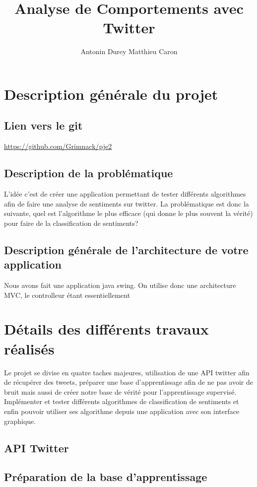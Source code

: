 \documentclass[a4paper,10pt]{report}
\title{Analyse de Comportements avec Twitter}
\author{Antonin Durey Matthieu Caron}
\begin{document}
\maketitle
\chapter{Description générale du projet}
  \section{Lien vers le git}
    \url{https://github.com/Grimnack/pje2}
  \section{Description de la problématique}
    L'idée c'est de créer une application permettant de tester différents algorithmes
    afin de faire une analyse de sentiments sur twitter. La problématique est donc la suivante,
    quel est l'algorithme le plus efficace (qui donne le plus souvent la vérité) pour faire de la 
    classification de sentiments?
  \section{Description générale de l'architecture de votre application}
    Nous avons fait une application java swing. On utilise donc une architecture MVC, le controlleur étant 
    essentiellement 
\chapter{Détails des différents travaux réalisés}
  Le projet se divise en quatre taches majeures, utilisation de une API twitter afin de récupérer 
  des tweets, préparer une base d'apprentissage afin de ne pas avoir de bruit mais aussi de créer notre 
  base de vérité pour l'apprentissage supervisé. Implémenter et tester différents algorithmes de classification de sentiments et
  enfin pouvoir utiliser ses algorithme depuis une application avec son interface graphique.
  \section{API Twitter}
  \section{Préparation de la base d'apprentissage}
\end{document}
